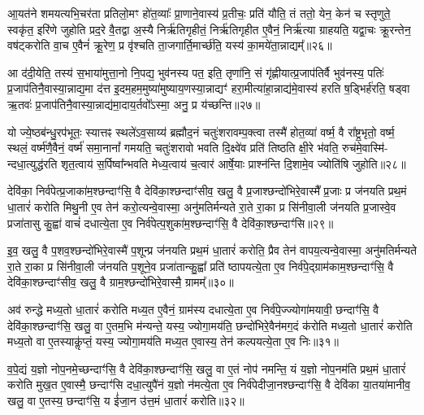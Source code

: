 आ॒यत॑ने शमयत्यभि॒चर॑ता प्रतिलो॒मꣳ हो॑त॒व्याः᳚ प्रा॒णाने॒वास्य॑ प्र॒तीचः॒ प्रति॑ यौति॒ तं ततो॒ येन॒ केन॑ च स्तृणुते॒ स्वकृ॑त॒ इरि॑णे जुहोति प्रद॒रे वै॒तद्वा अ॒स्यै निर्\mbox{}ऋ॑तिगृहीतं॒ निर्\mbox{}ऋ॑तिगृहीत ए॒वैनं॒ निर्\mbox{}ऋ॑त्या ग्राहयति॒ यद्वा॒चः क्रू॒रन्तेन॒ वष॑ट्करोति वा॒च ए॒वैनं॑ क्रू॒रेण॒ प्र वृ॑श्चति ता॒जगार्ति॒मार्च्छ॑ति॒ यस्य॑ का॒मये॑ता॒न्नाद्यम्᳚॥२६॥

आ द॑दी॒येति॒ तस्य॑ स॒भाया॑मुत्ता॒नो नि॒पद्य॒ भुव॑नस्य पत॒ इति॒ तृणा॑नि॒ सं गृ॑ह्णीयात्प्र॒जाप॑तिर्वै भुव॑नस्य॒ पतिः॑ प्र॒जाप॑तिनै॒वास्या॒न्नाद्य॒मा द॑त्त इ॒दम॒हम॒मुष्या॑मुष्याय॒णस्या॒न्नाद्यꣳ॑ हरा॒मीत्या॑हा॒न्नाद्य॑मे॒वास्य॑ हरति ष॒ड्भिर्\mbox{}ह॑रति॒ षड्वा ऋ॒तवः॑ प्र॒जाप॑तिनै॒वास्या॒न्नाद्य॑मा॒दाय॒र्तवो᳚\-ऽस्मा॒ अनु॒ प्र य॑च्छन्ति॥२७॥

यो ज्ये॒ष्ठब॑न्धु॒रप॑भूतः॒ स्यात्तꣴ स्थले॑\-ऽव॒साय्य॑ ब्रह्मौद॒नं चतुः॑शरावम्प॒क्त्वा तस्मै॑ होत॒व्या॑ वर्ष्म॒ वै रा᳚ष्ट्र॒भृतो॒ वर्ष्म॒ स्थलं॒ वर्ष्म॑णै॒वैनं॒ वर्ष्म॑ समा॒नानां᳚ गमयति॒ चतुः॑शरावो भवति दि॒क्ष्वे॑व प्रति॑ तिष्ठति क्षी॒रे भ॑वति॒ रुच॑मे॒वास्मि॑- न्दधा॒त्युद्ध॑रति शृत॒त्वाय॑ स॒र्पिष्वा᳚न्भवति मेध्य॒त्वाय॑ च॒त्वार॑ आर्\mbox{}षे॒याः प्राश्न॑न्ति दि॒शामे॒व ज्योति॑षि जुहोति॥२८॥

{\anuvakamend[{ग्रा॒मी यु॑नक्ती॒ध्मः स्व ए॒वैना॑न॒न्नाद्यं॑ यच्छ॒न्त्येका॒न्नप॑ञ्चा॒शच्च॑॥८॥}]}

देवि॑का॒ निर्व॑पेत्प्र॒जाका॑म॒श्छन्दाꣳ॑सि॒ वै देवि॑का॒श्छन्दाꣳ॑सीव॒ खलु॒ वै प्र॒जाश्छन्दो॑भिरे॒वास्मै᳚ प्र॒जाः प्र ज॑नयति प्रथ॒मं धा॒तारं॑ करोति मिथु॒नी ए॒व तेन॑ करो॒त्यन्वे॒वास्मा॒ अनु॑मतिर्मन्यते रा॒ते रा॒का प्र सि॑नीवा॒ली ज॑नयति प्र॒जास्वे॒व प्रजा॑तासु कु॒ह्वा॑ वाचं॑ दधात्ये॒ता ए॒व निर्व॑पेत्प॒शुका॑म॒श्छन्दाꣳ॑सि॒ वै देवि॑का॒श्छन्दाꣳ॑सि॥२९॥

इ॒व॒ खलु॒ वै प॒शव॒श्छन्दो॑भिरे॒वास्मै॑ प॒शून्प्र ज॑नयति प्रथ॒मं धा॒तारं॑ करोति॒ प्रैव तेन॑ वापय॒त्यन्वे॒वास्मा॒ अनु॑मतिर्मन्यते रा॒ते रा॒का प्र सि॑नीवा॒ली ज॑नयति प॒शूने॒व प्रजा॑तान्कु॒ह्वा᳚ प्रति॑ ष्ठापयत्ये॒ता ए॒व निर्व॑पे॒द्ग्राम॑काम॒श्छन्दाꣳ॑सि॒ वै देवि॑का॒श्छन्दाꣳ॑सीव॒ खलु॒ वै ग्राम॒श्छन्दो॑भिरे॒वास्मै॒ ग्रामम्᳚॥३०॥

अव॑ रुन्द्धे मध्य॒तो धा॒तारं॑ करोति मध्य॒त ए॒वैनं॒ ग्राम॑स्य दधात्ये॒ता ए॒व निर्व॑पे॒ज्ज्योगा॑मयावी॒ छन्दाꣳ॑सि॒ वै देवि॑का॒श्छन्दाꣳ॑सि॒ खलु॒ वा ए॒तम॒भि म॑न्यन्ते॒ यस्य॒ ज्योगा॒मय॑ति॒ छन्दो॑भिरे॒वैन॑मग॒दं क॑रोति मध्य॒तो धा॒तारं॑ करोति मध्य॒तो वा ए॒तस्याकॢ॑प्तं॒ यस्य॒ ज्योगा॒मय॑ति मध्य॒त ए॒वास्य॒ तेन॑ कल्पयत्ये॒ता ए॒व निः॥३१॥

व॒पे॒द्यं य॒ज्ञो नोप॒नमे॒च्छन्दाꣳ॑सि॒ वै देवि॑का॒श्छन्दाꣳ॑सि॒ खलु॒ वा ए॒तं नोप॑ नमन्ति॒ यं य॒ज्ञो नोप॒नम॑ति प्रथ॒मं धा॒तारं॑ करोति मुख॒त ए॒वास्मै॒ छन्दाꣳ॑सि दधा॒त्युपै॑नं य॒ज्ञो न॑मत्ये॒ता ए॒व निर्व॑पेदीजा॒नश्छन्दाꣳ॑सि॒ वै देवि॑का या॒तया॑मानीव॒ खलु॒ वा ए॒तस्य॒ छन्दाꣳ॑सि॒ य ई॑जा॒न उ॑त्त॒मं धा॒तारं॑ करोति॥३२॥

